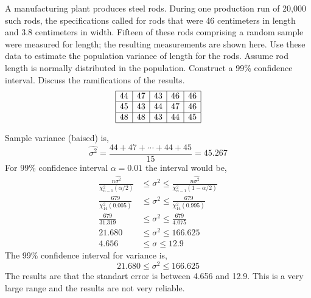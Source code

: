 \documentclass{exam}
\theoremstyle{mytheoremstyle}
\theoremstyle{mytheoremstyle}
\theoremstyle{myproblemstyle}
\begin{document}
\begin{questions}
    \question A manufacturing plant produces steel rods. During one production run of 20,000 such rods, the specifications called for rods that were 46 centimeters in length and 3.8 centimeters in width. Fifteen of these rods comprising a random sample were measured for length; the resulting measurements are shown here. Use these data to estimate the population variance of length for the rods. Assume rod length is normally distributed in the population. Construct a 99\% confidence interval. Discuss the ramifications of the results.
    \begin{align*}
        \begin{array}{|c|c|c|c|c|}
            \hline
            44 & 47 & 43 & 46 & 46 \\\hline
            45 & 43 & 44 & 47 & 46 \\\hline
            48 & 48 & 43 & 44 & 45 \\\hline
        \end{array}
    \end{align*}
    \begin{solution}
        Sample variance (baised) is,
        \[\hat{\sigma^{2}}=\frac{44+47+\cdots+44+45}{15}=45.267\]
        For 99\% confidence interval \(\alpha=0.01\) the interval would be,
        \begin{align*}
            \frac{n\hat{\sigma^{2}}}{\chi^{2}_{n-1}(\alpha/2)} & \le \sigma^{2}\le\frac{n\hat{\sigma^{2}}}{\chi^{2}_{n-1}(1-\alpha/2)} \\
            \frac{679}{\chi^{2}_{14}(0.005)}                   & \le \sigma^{2}\le\frac{679}{\chi^{2}_{14}(0.995)}                     \\
            \frac{679}{31.319}                                 & \le \sigma^{2}\le\frac{679}{4.075}                                    \\
            21.680                                             & \le \sigma^{2}\le 166.625                                             \\
            4.656                                              & \le \sigma \le 12.9
        \end{align*}
        The 99\% confidence interval for variance is,
        \[\boxed{21.680 \le \sigma^{2}\le 166.625}\]
        The results are that the standart error is between 4.656 and 12.9. This is a very large range and the results are not very reliable.
    \end{solution}
\end{questions}
\end{document}
